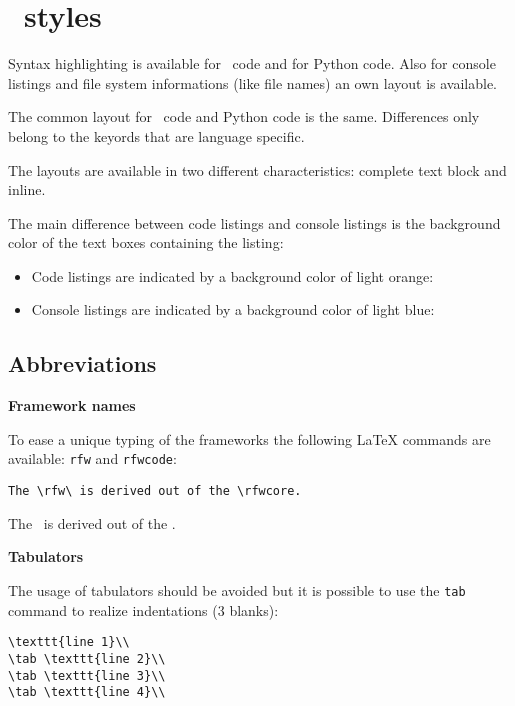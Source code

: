 \documentclass[a4paper,10pt]{report}
\begin{document}
\chapter{\rfw\ styles}

Syntax highlighting is available for \rfw\ code and for Python code. Also for console listings and file system informations (like file names)
an own layout is available.

The common layout for \rfw\ code and Python code is the same. Differences only belong to the keyords that are language specific.

The layouts are available in two different characteristics: complete text block and inline.

The main difference between code listings and console listings is the background color of the text boxes containing the listing:

\begin{itemize}
   \item Code listings are indicated by a background color of light orange: 
   \item Console listings are indicated by a background color of light blue: 
\end{itemize}


\section{Abbreviations}

\textbf{Framework names}

To ease a unique typing of the frameworks the following LaTeX commands are available: \texttt{rfw} and \texttt{rfwcode}:

\begin{verbatim}
The \rfw\ is derived out of the \rfwcore.
\end{verbatim}

The \rfw\ is derived out of the \rfwcore.

\vspace{2ex}

\textbf{Tabulators}

The usage of tabulators should be avoided but it is possible to use the \texttt{tab} command to realize indentations (3 blanks):

\begin{verbatim}
\texttt{line 1}\\
\tab \texttt{line 2}\\
\tab \texttt{line 3}\\
\tab \texttt{line 4}\\
\end{verbatim}
\end{document}

